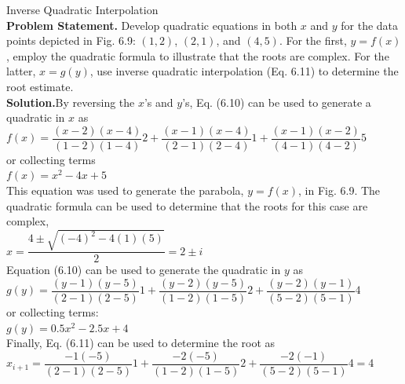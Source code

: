 \documentclass[../main.tex]{subfiles}
\begin{document}
\begin{example} Inverse Quadratic Interpolation\\

    \noindent\textbf{Problem Statement. }\quad Develop quadratic equations in both $x$ and $y$ for the data points
    depicted in Fig. 6.9: $(1, 2)$, $(2, 1)$, and $(4, 5)$. For the first, $y = f(x)$, employ the quadratic
    formula to illustrate that the roots are complex. For the latter, $x = g(y)$, use inverse quadratic
    interpolation (Eq. 6.11) to determine the root estimate.\\

    \noindent\textbf{Solution.}\quad By reversing the $x$'s and $y$'s, Eq. (6.10) can be used to generate a quadratic in $x$ as\\

    $f(x) = \dfrac{(x-2)(x-4)}{(1-2)(1-4)}2 + \dfrac{(x-1)(x-4)}{(2-1)(2-4)}1 +
    \dfrac{(x-1)(x-2)}{(4-1)(4-2)}5$\\

    \noindent or collecting terms\\

    $f(x)= x^2 - 4x + 5$\\

    \noindent This equation was used to generate the parabola, $y = f(x)$, in Fig. 6.9. The quadratic formula
    can be used to determine that the roots for this case are complex,\\

    $x = \dfrac{4\pm \sqrt{(-4)^2 - 4(1)(5)}}{2} = 2\pm i$\\

    \noindent Equation (6.10) can be used to generate the quadratic in $y$ as\\

    $g(y) = \dfrac{(y-1)(y-5)}{(2-1)(2-5)}1 + \dfrac{(y-2)(y-5)}{(1-2)(1-5)}2 +
    \dfrac{(y-2)(y-1)}{(5-2)(5-1)}4$\\

    \noindent or collecting terms:\\

    $g(y) = 0.5x^2-2.5x+4$\\

    \noindent Finally, Eq. (6.11) can be used to determine the root as\\

    $x_{i+1} = \dfrac{-1(-5)}{(2-1)(2-5)}1 + \dfrac{-2(-5)}{(1-2)(1-5)}2 +
    \dfrac{-2(-1)}{(5-2)(5-1)}4 = 4$\\    
\end{example}
\end{document}
